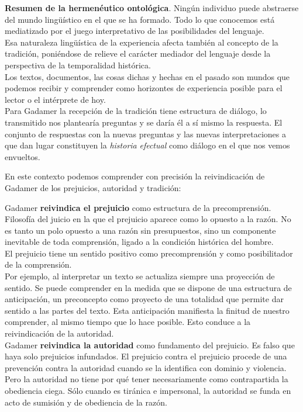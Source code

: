 \documentclass[a4paper, 11pt, twocolumn, spanish]{article}
\begin{document}
\textbf{Resumen de la hermenéutico ontológica}. Ningún individuo puede
abstraerse del mundo lingüístico en el que se ha formado. Todo lo que
conocemos está mediatizado por el juego interpretativo de las
posibilidades del lenguaje.\\[0pt]
 Esa naturaleza lingüística de la experiencia afecta también al
concepto de la tradición, poniéndose de relieve el carácter mediador
del lenguaje desde la perspectiva de la temporalidad histórica.\\[0pt]

Los textos, documentos, las cosas dichas y hechas en el pasado son
mundos que podemos recibir y comprender como horizontes de experiencia
posible para el lector o el intérprete de hoy.\\[0pt]
 Para Gadamer la recepción de la tradición tiene estructura de
diálogo, lo transmitido nos plantearía preguntas y se daría él a sí
mismo la respuesta. El conjunto de respuestas con la nuevas preguntas
y las nuevas interpretaciones a que dan lugar constituyen la
\emph{historia} \emph{efectual} como diálogo en el que nos vemos envueltos.


En este contexto podemos comprender con precisión la reivindicación de
Gadamer de los prejuicios, autoridad y tradición:

Gadamer \textbf{reivindica el prejuicio} como estructura de la
precomprensión. Filosofía del juicio en la que el prejuicio aparece
como lo opuesto a la razón. No es tanto un polo opuesto a una razón
sin presupuestos, sino un componente inevitable de toda comprensión,
ligado a la condición histórica del hombre.\\[0pt]

El prejuicio tiene un sentido positivo como precomprensión y como
posibilitador de la comprensión.\\[0pt]
Por ejemplo, al interpretar un texto se actualiza siempre una
proyección de sentido. Se puede comprender en la medida que se dispone
de una estructura de anticipación, un preconcepto como proyecto de una
totalidad que permite dar sentido a las partes del texto. Esta
anticipación manifiesta la finitud de nuestro comprender, al mismo
tiempo que lo hace posible. Esto conduce a la reivindicación de la
autoridad.\\[0pt]

Gadamer \textbf{reivindica la autoridad} como fundamento del prejuicio. Es
falso que haya solo prejuicios infundados. El prejuicio contra el
prejuicio procede de una prevención contra la autoridad cuando se la
identifica con dominio y violencia. Pero la autoridad no tiene por qué
tener necesariamente como contrapartida la obediencia ciega. Sólo
cuando es tiránica e impersonal, la autoridad se funda en acto de
sumisión y de obediencia de la razón.\\[0pt]
\end{document}
